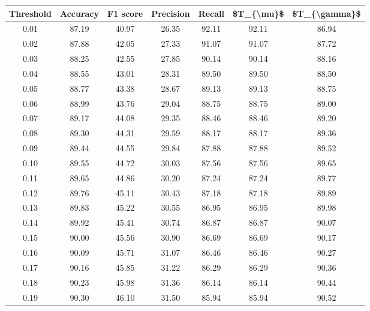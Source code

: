 \begin{tabular}{|c|c|c|c|c|c|c|}
\hline
 Threshold &  Accuracy &  F1 score &  Precision &  Recall &  \$T\_\{\textbackslash mu\}\$ &  \$T\_\{\textbackslash gamma\}\$ \\
\hline
      0.01 &     87.19 &     40.97 &      26.35 &   92.11 &      92.11 &         86.94 \\
      0.02 &     87.88 &     42.05 &      27.33 &   91.07 &      91.07 &         87.72 \\
      0.03 &     88.25 &     42.55 &      27.85 &   90.14 &      90.14 &         88.16 \\
      0.04 &     88.55 &     43.01 &      28.31 &   89.50 &      89.50 &         88.50 \\
      0.05 &     88.77 &     43.38 &      28.67 &   89.13 &      89.13 &         88.75 \\
      0.06 &     88.99 &     43.76 &      29.04 &   88.75 &      88.75 &         89.00 \\
      0.07 &     89.17 &     44.08 &      29.35 &   88.46 &      88.46 &         89.20 \\
      0.08 &     89.30 &     44.31 &      29.59 &   88.17 &      88.17 &         89.36 \\
      0.09 &     89.44 &     44.55 &      29.84 &   87.88 &      87.88 &         89.52 \\
      0.10 &     89.55 &     44.72 &      30.03 &   87.56 &      87.56 &         89.65 \\
      0.11 &     89.65 &     44.86 &      30.20 &   87.24 &      87.24 &         89.77 \\
      0.12 &     89.76 &     45.11 &      30.43 &   87.18 &      87.18 &         89.89 \\
      0.13 &     89.83 &     45.22 &      30.55 &   86.95 &      86.95 &         89.98 \\
      0.14 &     89.92 &     45.41 &      30.74 &   86.87 &      86.87 &         90.07 \\
      0.15 &     90.00 &     45.56 &      30.90 &   86.69 &      86.69 &         90.17 \\
      0.16 &     90.09 &     45.71 &      31.07 &   86.46 &      86.46 &         90.27 \\
      0.17 &     90.16 &     45.85 &      31.22 &   86.29 &      86.29 &         90.36 \\
      0.18 &     90.23 &     45.98 &      31.36 &   86.14 &      86.14 &         90.44 \\
      0.19 &     90.30 &     46.10 &      31.50 &   85.94 &      85.94 &         90.52 \\

\end{tabular}
